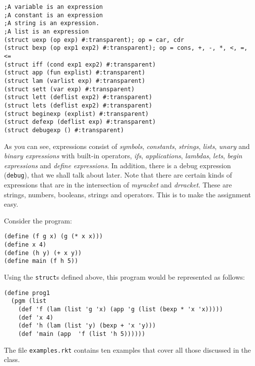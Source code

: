 \documentclass[11pt]{article}
\newcommand{\myr}{\textit{myracket}}
\begin{document}
\begin{verbatim}
;A variable is an expression
;A constant is an expression
;A string is an expression.
;A list is an expression 
(struct uexp (op exp) #:transparent); op = car, cdr
(struct bexp (op exp1 exp2) #:transparent); op = cons, +, -, *, <, =, <=
(struct iff (cond exp1 exp2) #:transparent)
(struct app (fun explist) #:transparent) 
(struct lam (varlist exp) #:transparent)
(struct sett (var exp) #:transparent)
(struct lett (deflist exp2) #:transparent)
(struct lets (deflist exp2) #:transparent)
(struct beginexp (explist) #:transparent)
(struct defexp (deflist exp) #:transparent)
(struct debugexp () #:transparent)
\end{verbatim}
As you can see, expressions consist of {\it symbols}, {\it constants}, {\it strings}, {\it lists}, {\it unary} and {\it binary expressions}    with built-in operators, {\it ifs}, {\it applications}, {\it lambdas}, {\it lets}, {\it begin expressions} and {\it define expressions}. In addition, there is a debug expression ({\tt debug}), that we shall talk about later. Note that there are certain kinds of expressions  that are in the intersection of {\myr} and {\it drracket}. These are strings, numbers, booleans, strings and operators.  This is to make the assignment easy.  

Consider the program:
\begin{verbatim}
(define (f g x) (g (* x x))) 
(define x 4)
(define (h y) (+ x y))
(define main (f h 5))
\end{verbatim} 
Using the {\tt struct}s defined above, this program would be represented as follows:
\begin{verbatim}
(define prog1
  (pgm (list
    (def 'f (lam (list 'g 'x) (app 'g (list (bexp * 'x 'x)))))
    (def 'x 4)
    (def 'h (lam (list 'y) (bexp + 'x 'y)))
    (def 'main (app  'f (list 'h 5))))))
\end{verbatim}

The file  {\tt examples.rkt} contains ten examples that cover all those discussed in the class. 
\end{document}
